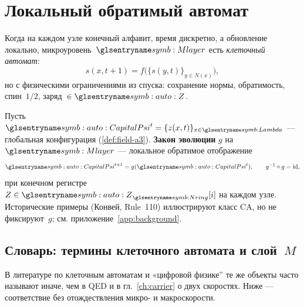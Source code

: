 \section{Локальный обратимый автомат}
\label{sec:descent-ca}

Когда на каждом узле конечный алфавит, время дискретно, а обновление локально,
микроуровень~$\layerMicro$ есть \emph{клеточный автомат}:
\[
  s(x,t+1)=f\bigl(\{s(y,t)\}_{y\in N(x)}\bigr),
\]
но с физическими ограничениями из спуска: сохранение нормы, обратимость, спин~$1/2$, заряд~$\in\spaceZ$.

\begin{definition}
\label{def:g-ca}
Пусть $\symCapitalPsi^t=\{z(x,t)\}_{x\in\carrierLattice}$ --- глобальная конфигурация (\cref{def:field-a3}).
\textbf{Закон эволюции} $g$ на~$\layerMicro$ --- локальное обратимое отображение
\[
  \symCapitalPsi^{t+1}=g(\symCapitalPsi^t),\qquad g^{-1}\circ g=\mathrm{id},
\]
при конечном регистре $Z\in\spaceZ_{\phaseRingCount}[i]$ на каждом узле.
Исторические примеры (Конвей, Rule~110) иллюстрируют класс CA, но не фиксируют~$g$;
см. приложение~\ref{app:background}.
\end{definition}

\subsection{Словарь: термины клеточного автомата и слой~\texorpdfstring{$M$}{M}}
\label{sec:ca-terminology}

В литературе по клеточным автоматам и «цифровой физике'' те же объекты часто называют иначе,
чем в QED и в гл.~\ref{ch:carrier} о двух скоростях.
Ниже --- соответствие без отождествления микро- и макроскорости.

